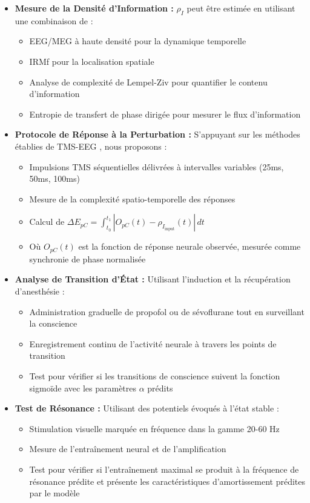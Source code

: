 \documentclass[12pt]{article}
\begin{document}
\begin{itemize}
    \item \textbf{Mesure de la Densité d'Information :} $\rho_I$ peut être estimée en utilisant une combinaison de :
    \begin{itemize}[label=--]
        \item EEG/MEG à haute densité pour la dynamique temporelle
        \item IRMf pour la localisation spatiale
        \item Analyse de complexité de Lempel-Ziv pour quantifier le contenu d'information \cite{schartner2015,casali2013}
        \item Entropie de transfert de phase dirigée pour mesurer le flux d'information \cite{hillebrand2016}
    \end{itemize}
    
    \item \textbf{Protocole de Réponse à la Perturbation :} S'appuyant sur les méthodes établies de TMS-EEG \cite{casarotto2016}, nous proposons :
    \begin{itemize}[label=--]
        \item Impulsions TMS séquentielles délivrées à intervalles variables (25ms, 50ms, 100ms)
        \item Mesure de la complexité spatio-temporelle des réponses
        \item Calcul de $\Delta E_{pC} = \int_{t_0}^{t_1} |O_{pC}(t) - \rho_{I_{\text{input}}}(t)| \, dt$
        \item Où $O_{pC}(t)$ est la fonction de réponse neurale observée, mesurée comme synchronie de phase normalisée
    \end{itemize}
    
    \item \textbf{Analyse de Transition d'État :} Utilisant l'induction et la récupération d'anesthésie :
    \begin{itemize}[label=--]
        \item Administration graduelle de propofol ou de sévoflurane tout en surveillant la conscience
        \item Enregistrement continu de l'activité neurale à travers les points de transition
        \item Test pour vérifier si les transitions de conscience suivent la fonction sigmoïde avec les paramètres $\alpha$ prédits
    \end{itemize}
    
    \item \textbf{Test de Résonance :} Utilisant des potentiels évoqués à l'état stable :
    \begin{itemize}[label=--]
        \item Stimulation visuelle marquée en fréquence dans la gamme 20-60 Hz
        \item Mesure de l'entraînement neural et de l'amplification
        \item Test pour vérifier si l'entraînement maximal se produit à la fréquence de résonance prédite et présente les caractéristiques d'amortissement prédites par le modèle
    \end{itemize}
\end{itemize}
\end{document}
